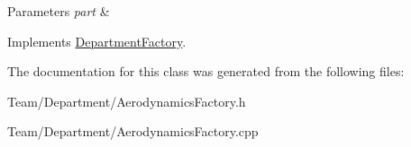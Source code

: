 \begin{DoxyParams}{Parameters}
{\em part} & \\
\hline
\end{DoxyParams}


Implements \hyperlink{classDepartmentFactory_a41e5c96ee84f8237cb08d31cd782efae}{Department\+Factory}.



The documentation for this class was generated from the following files\+:\begin{DoxyCompactItemize}
\item 
Team/\+Department/Aerodynamics\+Factory.\+h\item 
Team/\+Department/Aerodynamics\+Factory.\+cpp\end{DoxyCompactItemize}
